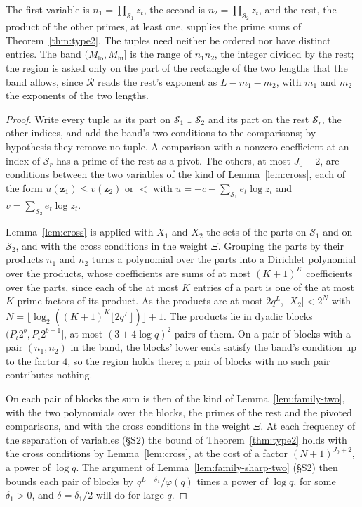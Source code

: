 \documentclass[11pt]{article}
\theoremstyle{definition}
\begin{document}
The first variable is $n_1 = \prod_{\mathcal S_1} z_t$, the second is $n_2 = \prod_{\mathcal S_2} z_t$, and the rest,
the product of the other primes, at least one, supplies the prime sums of Theorem~\ref{thm:type2}. The tuples need
neither be ordered nor have distinct entries. The band $(M_{\mathrm{lo}}, M_{\mathrm{hi}}]$ is the range of $n_1 n_2$,
the integer divided by the rest; the region is asked only on the part of the rectangle of the two lengths that the band
allows, since $\mathcal R$ reads the rest's exponent as $L - m_1 - m_2$, with $m_1$ and $m_2$ the exponents of the two
lengths.

\begin{proof}
Write every tuple as its part on $\mathcal S_1 \cup \mathcal S_2$ and its part on the rest $\mathcal S_r$, the other
indices, and add the band's two conditions to the comparisons; by hypothesis they remove no tuple. A comparison with a
nonzero coefficient at an index of $\mathcal S_r$ has a prime of the rest as a pivot. The others, at most $J_0 + 2$,
are conditions between the two variables of the kind of Lemma~\ref{lem:cross}, each of the form
$u(\mathbf z_1) \le v(\mathbf z_2)$ or $<$ with $u = -c - \sum_{\mathcal S_1} e_t \log z_t$ and
$v = \sum_{\mathcal S_2} e_t \log z_t$.

Lemma~\ref{lem:cross} is applied with $X_1$ and $X_2$ the sets of the parts on $\mathcal S_1$ and on $\mathcal S_2$,
and with the cross conditions in the weight $\Xi$. Grouping the parts by their products $n_1$ and $n_2$ turns a
polynomial over the parts into a Dirichlet polynomial over the products, whose coefficients are sums of at most
$(K + 1)^K$ coefficients over the parts, since each of the at most $K$ entries of a part is one of the at most $K$
prime factors of its product. As the products are at most $2q^L$, $|X_2| < 2^N$ with
$N = \lfloor \log_2((K + 1)^K \lfloor 2q^L \rfloor) \rfloor + 1$.
The products lie in dyadic blocks $(P_\iota 2^b, P_\iota 2^{b + 1}]$, at most $(3 + 4\log q)^2$ pairs of them. On a
pair of blocks with a pair $(n_1, n_2)$ in the band, the blocks' lower ends satisfy the band's condition up to the
factor $4$, so the region holds there; a pair of blocks with no such pair contributes nothing.

On each pair of blocks the sum is then of the kind of Lemma~\ref{lem:family-two}, with the two polynomials over the
blocks, the primes of the rest and the pivoted comparisons, and with the cross conditions in the weight $\Xi$. At each
frequency of the separation of variables (\S S2) the bound of Theorem~\ref{thm:type2} holds with the cross conditions
by Lemma~\ref{lem:cross}, at the cost of a factor $(N + 1)^{J_0 + 2}$, a power of $\log q$. The argument of
Lemma~\ref{lem:family-sharp-two} (\S S2) then bounds each pair of blocks by $q^{L - \delta_1}/\varphi(q)$ times a power
of $\log q$, for some $\delta_1 > 0$, and $\delta = \delta_1/2$ will do for large $q$.
\end{proof}
\end{document}
